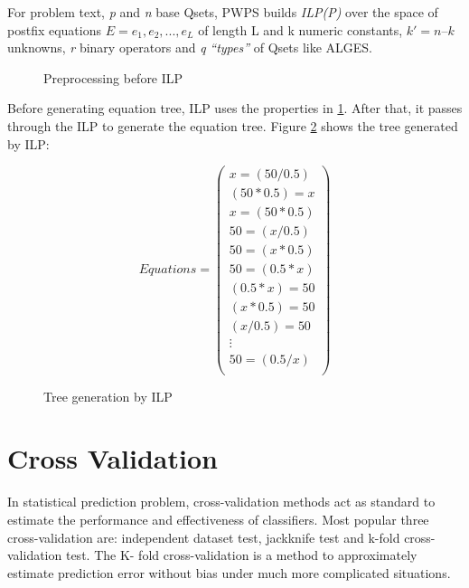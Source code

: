 \documentclass[document.tex]{subfiles}
\begin{document}
For problem text, \textit{p} and \textit{n} base Qsets, PWPS builds \textit{ILP(P)} over the space of postfix equations $ E = e_1, e_2,...,e_L $ of length L  and k numeric constants, $k'  = n – k$ unknowns, \textit{r} binary operators and \textit{q} \textit{“types”} of Qsets like ALGES.

\begin{figure}[H]
	\begin{center}
	\end{center}
	\caption{Preprocessing before ILP}
	\label{fig:i_Pre_ILP}
\end{figure}
Before generating equation tree, ILP uses the properties in \ref{fig:i_Pre_ILP}. After that, it passes through the ILP to generate the equation tree. Figure \ref{fig:i_ILP} shows the tree generated by ILP:
\begin{figure}[H]
	\begin{center}
	\[Equations = 
	\begin{pmatrix}
	x=(50/0.5)\\
	(50*0.5)=x\\
	x=(50*0.5)\\
	50=(x/0.5)\\
	50=(x*0.5)\\
	50=(0.5*x)\\
	(0.5*x)=50\\
	(x*0.5)=50\\
	(x/0.5)=50\\
	\vdots\\
	50=(0.5/x)\\
	\end{pmatrix}\]
	\end{center}
	\caption{Tree generation by ILP}
	\label{fig:i_ILP}
\end{figure}
\section{Cross Validation}
In statistical prediction problem, cross-validation methods act as standard to estimate the performance and effectiveness of classifiers. Most popular three cross-validation are: independent dataset test, jackknife test and k-fold cross-validation test. The K- fold cross-validation is a method to approximately estimate prediction error without bias under much more complicated situations. 
\end{document}

